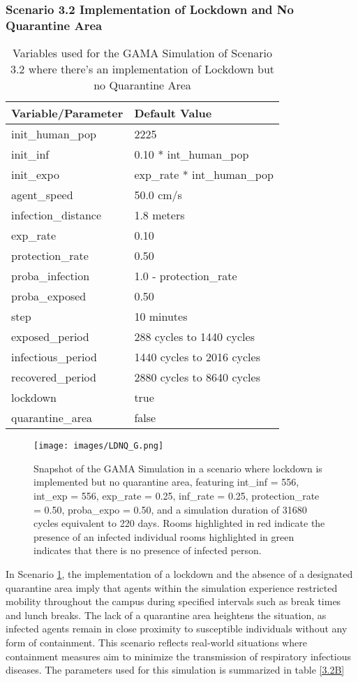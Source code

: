 \subsubsection{ Scenario 3.2 Implementation of Lockdown and No Quarantine Area}

	\begin{table}[H]
	\centering
	\begin{tabular}{ll}
		\toprule
		\textbf{Variable/}\textbf{Parameter} & \textbf{Default Value}\\
		\hline
		init\_human\_pop & 2225\\
		init\_inf & 0.10 * int\_human\_pop\\
		init\_expo & exp\_rate * int\_human\_pop \\
		agent\_speed & 50.0 cm/s\\
		infection\_distance & 1.8 meters\\
		exp\_rate & 0.10\\
		protection\_rate & 0.50\\
		proba\_infection & 1.0 - protection\_rate\\
		proba\_exposed & 0.50\\
		step & 10 minutes\\
		exposed\_period & 288 cycles to 1440 cycles\\
		infectious\_period & 1440 cycles to 2016 cycles\\
		recovered\_period & 2880 cycles to 8640 cycles\\ 
		lockdown & true\\
		quarantine\_area & false\\
		\bottomrule
	\end{tabular}
	\caption{Variables used for the GAMA Simulation of Scenario 3.2 where there's an implementation of Lockdown but no Quarantine Area}
	\label{3.2b}
\end{table}
		\begin{figure}[H]
	\centering
	\texttt{[image: images/LDNQ\_G.png]}
	\caption{Snapshot of the GAMA Simulation in a scenario where lockdown is implemented but no quarantine area, featuring int\_inf = 556, int\_exp = 556, exp\_rate = 0.25, inf\_rate = 0.25, protection\_rate = 0.50, proba\_expo = 0.50, and a simulation duration of 31680 cycles equivalent to 220 days. Rooms highlighted in red indicate the presence of an infected individual rooms highlighted in green indicates that there is no presence of infected person.}
	\label{3.2G}
\end{figure}
In Scenario \ref{3.2b}, the implementation of a lockdown and the absence of a designated quarantine area imply that agents within the simulation experience restricted mobility throughout the campus during specified intervals such as break times and lunch breaks. The lack of a quarantine area heightens the situation, as infected agents remain in close proximity to susceptible individuals without any form of containment. This scenario reflects real-world situations where containment measures aim to minimize the transmission of respiratory infectious diseases. The parameters used for this simulation is summarized in table \ref{3.2B}

